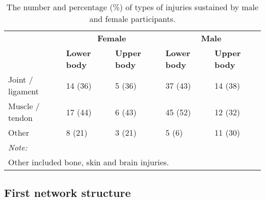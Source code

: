 \documentclass[
  english,
  man]{apa6}
\begin{document}
\begin{table}[H]

\caption{\label{tab:table4}The number and percentage (\%) of types of injuries sustained by male and female participants.}
\centering
\begin{tabular}[t]{l|l|l|l|l}
\hline
\multicolumn{1}{c|}{\textbf{ }} & \multicolumn{2}{c|}{\textbf{Female}} & \multicolumn{2}{c}{\textbf{Male}} \\
\cline{2-3} \cline{4-5}
\textbf{} & \textbf{Lower body} & \textbf{Upper body} & \textbf{Lower body} & \textbf{Upper body}\\
\hline
Joint / ligament & 14 (36) & 5 (36) & 37 (43) & 14 (38)\\
\hline
Muscle / tendon & 17 (44) & 6 (43) & 45 (52) & 12 (32)\\
\hline
Other & 8 (21) & 3 (21) & 5 (6) & 11 (30)\\
\hline
\multicolumn{5}{l}{\textit{Note: }}\\
\multicolumn{5}{l}{Other included bone, skin and brain injuries.}\\
\end{tabular}
\end{table}

\hypertarget{first-network-structure}{%
\subsection{First network structure}\label{first-network-structure}}
\end{document}
